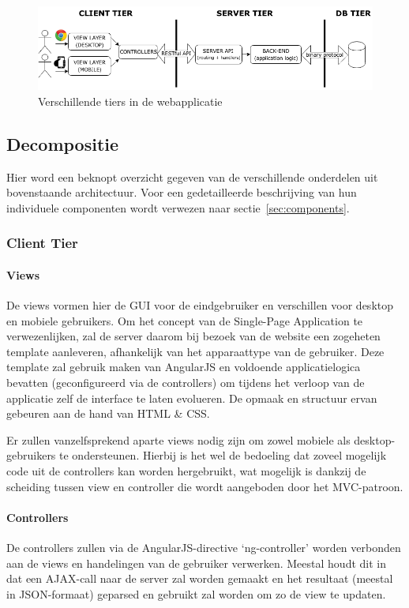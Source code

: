 \documentclass{article}
\begin{document}
\begin{figure}[!h]
\centering
 \includegraphics[width=140mm]{Architecture.png}
 \caption{Verschillende tiers in de webapplicatie}
 \label{Architecture}
\end{figure}

\subsection{Decompositie}

Hier word een beknopt overzicht gegeven van de verschillende onderdelen uit bovenstaande architectuur. Voor een gedetailleerde beschrijving van hun individuele componenten wordt verwezen naar sectie~\ref{sec:components}.

\subsubsection{Client Tier}

\paragraph{Views} 
De views vormen hier de GUI voor de eindgebruiker en verschillen voor desktop en mobiele gebruikers. Om het concept van de Single-Page Application te verwezenlijken, zal de server daarom bij bezoek van de website een zogeheten template aanleveren, afhankelijk van het apparaattype van de gebruiker. Deze template zal gebruik maken van AngularJS en voldoende applicatielogica bevatten (geconfigureerd via de controllers) om tijdens het verloop van de applicatie zelf de interface te laten evolueren. De opmaak en structuur ervan gebeuren aan de hand van HTML \& CSS.

Er zullen vanzelfsprekend aparte views nodig zijn om zowel mobiele als desktop-gebruikers te ondersteunen. Hierbij is het wel de bedoeling dat zoveel mogelijk code uit de controllers kan worden hergebruikt, wat mogelijk is dankzij de scheiding tussen view en controller die wordt aangeboden door het MVC-patroon.

\paragraph{Controllers} 
De controllers zullen via de AngularJS-directive `ng-controller' worden verbonden aan de views en handelingen van de gebruiker verwerken. Meestal houdt dit in dat een AJAX-call naar de server zal worden gemaakt en het resultaat (meestal in JSON-formaat) geparsed en gebruikt zal worden om zo de view te updaten.
\end{document}
